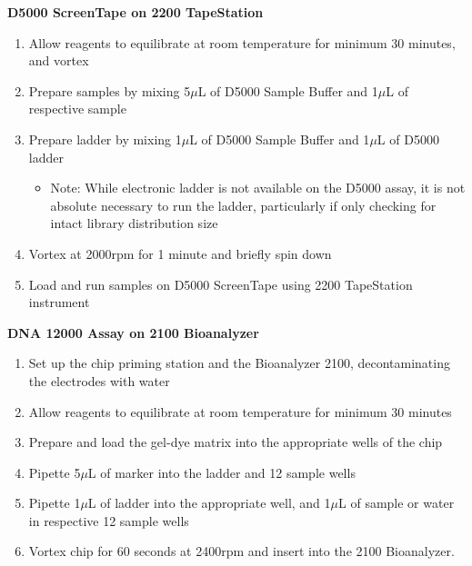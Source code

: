 \textbf{D5000 ScreenTape on 2200 TapeStation}
\begin{enumerate}
	\item Allow reagents to equilibrate at room temperature for minimum 30 minutes, and vortex
	\item Prepare samples by mixing 5$\mu$L of D5000 Sample Buffer and 1$\mu$L of respective sample
	\item Prepare ladder by mixing 1$\mu$L of D5000 Sample Buffer and 1$\mu$L of D5000 ladder
	\begin{itemize}
		\item Note: While electronic ladder is not available on the D5000 assay, it is not absolute necessary to run the ladder, particularly if only checking for intact library distribution size 
	\end{itemize} 
	\item Vortex at 2000rpm for 1 minute and briefly spin down
	\item Load and run samples on D5000 ScreenTape using 2200 TapeStation instrument 	
\end{enumerate}


\textbf{DNA 12000 Assay on 2100 Bioanalyzer}
\begin{enumerate}
	\item Set up the chip priming station and the Bioanalyzer 2100, decontaminating the electrodes with water
	\item Allow reagents to equilibrate at room temperature for minimum 30 minutes
	\item Prepare and load the gel-dye matrix into the appropriate wells of the chip 
	\item Pipette 5$\mu$L of marker into the ladder and 12 sample wells 
	\item Pipette 1$\mu$L of ladder into the appropriate well, and 1$\mu$L of sample or water in respective 12 sample wells
	\item Vortex chip for 60 seconds at 2400rpm and insert into the 2100 Bioanalyzer.
\end{enumerate} 


